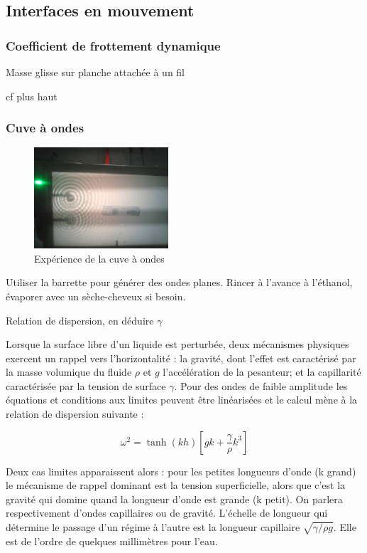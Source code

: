 \documentclass{article}%
\begin{document}
\subsection{Interfaces en mouvement}
\subsubsection{Coefficient de frottement dynamique}
Masse glisse sur planche attachée à un fil

cf plus haut

\subsubsection{Cuve à ondes}

\begin{figure}
	\centerline{\includegraphics[width=5cm]{images-exp/cuve_ondes.jpg}}
 \caption{Expérience de la cuve à ondes}
\end{figure}
Utiliser la barrette pour générer des ondes planes. Rincer à l'avance à l'éthanol, évaporer avec un sèche-cheveux si besoin.

Relation de dispersion, en déduire $\gamma$

Lorsque la surface libre d'un liquide est perturbée, deux mécanismes physiques exercent un rappel vers l'horizontalité : la gravité, dont l'effet est caractérisé par la masse volumique du fluide $\rho$ et $g$ l'accélération de la pesanteur; et la capillarité caractérisée par la tension de surface $\gamma$. Pour des ondes de faible amplitude les équations et conditions aux limites peuvent être linéarisées et le calcul mène à la relation de dispersion suivante :

\[ \omega^2 =\tanh(kh) \left[ g k + \frac{\gamma}{\rho } k^{3} \right] \]

Deux cas limites apparaissent alors : pour les petites longueurs d'onde (k grand) le mécanisme de rappel dominant est la tension superficielle, alors que c'est la gravité qui domine quand la longueur d'onde est grande (k petit). On parlera respectivement d'ondes capillaires ou de gravité. L'échelle de longueur qui détermine le passage d'un régime à l'autre est la longueur capillaire $\sqrt{\gamma / \rho g}$. Elle est de l'ordre de quelques millimètres pour l'eau.
\end{document}
